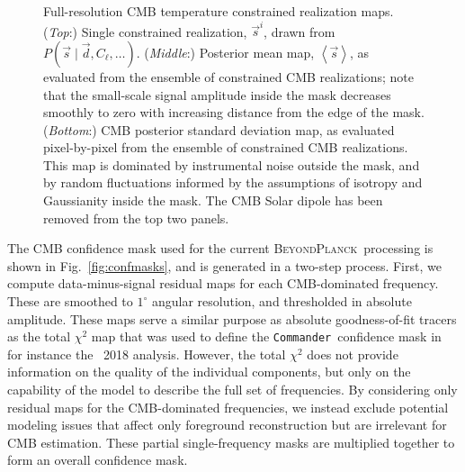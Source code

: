 \documentclass[twocolumn]{aa}
\def\commander{\texttt{Commander}}
\renewcommand{\d}[0]{\vec{d}}
\newcommand{\s}[0]{\vec{s}}
\newcommand{\BP}{\textsc{BeyondPlanck}}
\begin{document}
\begin{figure}[t]
  \caption{Full-resolution CMB temperature constrained realization
    maps. (\emph{Top}:) Single constrained realization, $\s^i$, drawn
    from $P(\s\mid \d, C_{\ell}, \ldots)$. (\emph{Middle}:) Posterior mean
    map, $\left<\s\right>$, as evaluated from the ensemble of
    constrained CMB realizations; note that the small-scale signal
    amplitude inside the mask decreases smoothly to zero with
    increasing distance from the edge of the mask. (\emph{Bottom}:) CMB posterior
    standard deviation map, as evaluated pixel-by-pixel from the
    ensemble of constrained CMB realizations. This map is dominated by
    instrumental noise outside the mask, and by random fluctuations
    informed by the assumptions of isotropy and Gaussianity inside the
    mask. The CMB Solar dipole has been removed from the top two panels.}\label{fig:cmbmaps_highl}
\end{figure}

The CMB confidence mask used for the current \BP\ processing is shown
in Fig.~\ref{fig:confmasks}, and is generated in a two-step
process. First, we compute data-minus-signal residual maps for each
CMB-dominated frequency. These are smoothed to $1^{\circ}$ angular
resolution, and thresholded in absolute amplitude. These maps serve a
similar purpose as absolute goodness-of-fit tracers as the total
$\chi^2$ map that was used to define the \commander\ confidence mask
in for instance the \Planck\ 2018 analysis. However, the total $\chi^2$ does not provide information on the quality of the individual components, but only on the capability of the model to describe the full set of frequencies. By considering only residual maps for the CMB-dominated frequencies, we instead exclude potential modeling issues that affect only foreground reconstruction but are irrelevant for CMB estimation. These partial single-frequency masks
are multiplied together to form an overall confidence mask. 
\end{document}
